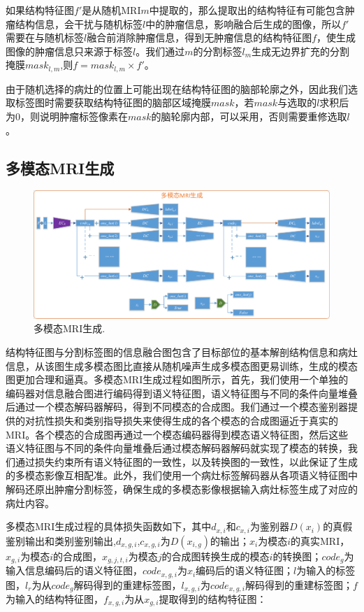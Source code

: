 \documentclass[letterpaper]{article} %
\begin{document}
如果结构特征图$f'$是从随机MRI$m$中提取的，那么提取出的结构特征有可能包含肿瘤结构信息，会干扰与随机标签$l$中的肿瘤信息，影响融合后生成的图像，所以$f'$需要在与随机标签$l$融合前消除肿瘤信息，得到无肿瘤信息的结构特征图$f$，使生成图像的肿瘤信息只来源于标签$l$。我们通过$m$的分割标签$l_m$生成无边界扩充的分割掩膜$mask_{l,m}$,则$f=mask_{l,m}\times f'$。

由于随机选择的病灶的位置上可能出现在结构特征图的脑部轮廓之外，因此我们选取标签图时需要获取结构特征图的脑部区域掩膜$mask$，若$mask$与选取的$l$求积后为0，则说明肿瘤标签像素在$mask$的脑轮廓内部，可以采用，否则需要重修选取$l$。

\subsection{多模态MRI生成}
\begin{figure}
	\centering
	\includegraphics[width=0.98\linewidth]{figures/mm_mri_generate}
	\caption{多模态MRI生成.}
	\label{mm_mri_generate}
\end{figure}
结构特征图与分割标签图的信息融合图包含了目标部位的基本解剖结构信息和病灶信息，从该图生成多模态图比直接从随机噪声生成多模态图更易训练，生成的模态图更加合理和逼真。多模态MRI生成过程如图所示，首先，我们使用一个单独的编码器对信息融合图进行编码得到语义特征图，语义特征图与不同的条件向量堆叠后通过一个模态解码器解码，得到不同模态的合成图。我们通过一个模态鉴别器提供的对抗性损失和类别指导损失来使得生成的各个模态的合成图逼近于真实的MRI。各个模态的合成图再通过一个模态编码器得到模态语义特征图，然后这些语义特征图与不同的条件向量堆叠后通过模态解码器解码就实现了模态的转换，我们通过损失约束所有语义特征图的一致性，以及转换图的一致性，以此保证了生成的多模态影像互相配准。此外，我们使用一个病灶标签解码器从各项语义特征图中解码还原出肿瘤分割标签，确保生成的多模态影像根据输入病灶标签生成了对应的病灶内容。

多模态MRI生成过程的具体损失函数如下，其中$d_{x,i}$和$c_{x,i}$为鉴别器$D(x_i)$的真假鉴别输出和类别鉴别输出,$d_{x,g,i}$,$c_{x,g,i}$为$D(x_{i,g})$的输出；$x_i$为模态$i$的真实MRI，$x_{g,i}$为模态$i$的合成图，$x_{g,j,t,i}$为模态$j$的合成图转换生成的模态$i$的转换图；$code_g$为输入信息编码后的语义特征图，$code_{x,g,i}$为$x_i$编码后的语义特征图；$l$为输入的标签图，$l_r$为从$code_g$解码得到的重建标签图，$l_{x,g,i}$为$code_{x,g,i}$解码得到的重建标签图；$f$为输入的结构特征图，$f_{x,g,i}$为从$x_{g,i}$提取得到的结构特征图：
\end{document}
